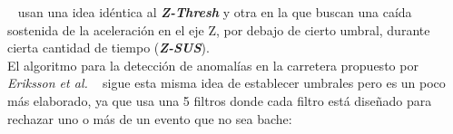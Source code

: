 		~\textcite{mohan2008nericell} usan una idea idéntica al \emph{\textbf{Z-Thresh}} y otra en la que buscan una caída sostenida de la 
		aceleración en el eje Z, por debajo de cierto umbral, durante cierta cantidad de tiempo (\emph{\textbf{Z-SUS}}).\\





		El algoritmo para la detección de anomalías en la carretera propuesto por \emph{Eriksson et al.} ~ sigue
		esta misma idea de establecer umbrales pero es un poco más elaborado, ya que usa una 5 filtros donde cada filtro está diseñado
		para rechazar uno o más de un evento que no sea bache:\\

